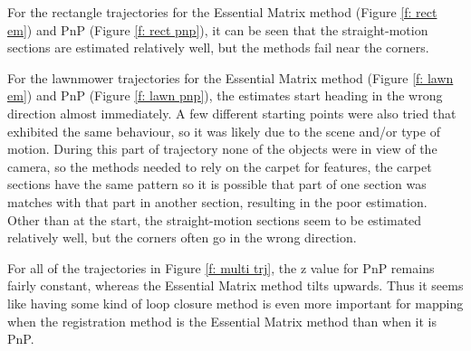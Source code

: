 \documentclass[12pt,a4paper]{article}
\begin{document}
    For the rectangle trajectories for the Essential Matrix method (Figure \ref{f: rect em}) and PnP (Figure \ref{f: rect pnp}), it can be seen that the straight-motion sections are estimated relatively well, but the methods fail near the corners.
     
    For the lawnmower trajectories for the Essential Matrix method (Figure \ref{f: lawn em}) and PnP (Figure \ref{f: lawn pnp}), the estimates start heading in the wrong direction almost immediately. A few different starting points were also tried that exhibited the same behaviour, so it was likely due to the scene and/or type of motion. During this part of trajectory none of the objects were in view of the camera, so the methods needed to rely on the carpet for features, the carpet sections have the same pattern so it is possible that part of one section was matches with that part in another section, resulting in the poor estimation. Other than at the start, the straight-motion sections seem to be estimated relatively well, but the corners often go in the wrong direction. 
     
    For all of the trajectories in Figure \ref{f: multi trj}, the z value for PnP remains fairly constant, whereas the Essential Matrix method tilts upwards. Thus it seems like having some kind of loop closure method is even more important for mapping when the registration method is the Essential Matrix method than when it is PnP. 
\end{document}
